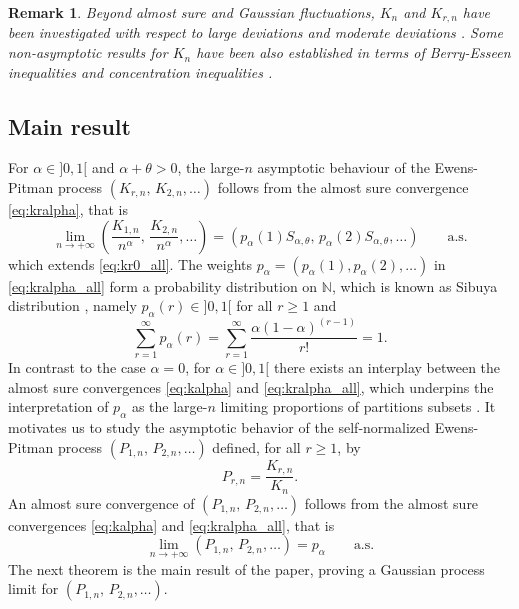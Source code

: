 \documentclass[twoside,12pt]{article}
\newtheorem{remark}[thm]{Remark}
\begin{document}
\begin{remark}
Beyond almost sure and Gaussian fluctuations, $K_{n}$ and $K_{r,n}$ have been investigated with respect to large deviations and moderate deviations \citep{Fen(98),Fav(14),Fav(18),BF25}. Some non-asymptotic results for $K_{n}$ have been also established in terms of Berry-Esseen inequalities \citep{Dol(20),Dol(21)} and concentration inequalities \citep{Per(22),BF25}.
\end{remark}

\subsection{Main result}

For $\alpha\in]0,1[$ and $\alpha+ \theta>0$, the large-$n$ asymptotic behaviour of the Ewens-Pitman process $(K_{r,n},\,K_{2,n},\ldots)$ follows from the almost sure convergence \eqref{eq:kralpha}, that is
\begin{equation}\label{eq:kralpha_all}
\lim_{n\rightarrow+\infty}\left(\frac{K_{1,n}}{n^{\alpha}},\,\frac{K_{2,n}}{n^{\alpha}},\ldots\right)=(p_{\alpha}(1)S_{\alpha,\theta},\,p_{\alpha}(2)S_{\alpha,\theta},\ldots)\qquad\text{a.s.}
\end{equation}
which extends \eqref{eq:kr0_all}. The weights $p_\alpha=(p_{\alpha}(1),p_{\alpha}(2),\ldots)$ in \eqref{eq:kralpha_all} form a probability distribution on $\mathbb{N}$, which is known as Sibuya distribution \citep{Dev(93)}, namely $p_{\alpha}(r)\in]0,1[$ for all $r\geq1$ and 
\begin{equation}\label{sum_sibuya}
\sum_{r=1}^\infty p_{\alpha}(r)=\sum_{r=1}^\infty \frac{\alpha(1-\alpha)^{(r-1)}}{r!} =1.
\end{equation}
In contrast to the case $\alpha=0$, for $\alpha\in]0,1[$ there exists an interplay between the almost sure convergences \eqref{eq:kalpha} and \eqref{eq:kralpha_all}, which underpins the interpretation of $p_{\alpha}$ as the large-$n$ limiting proportions of partitions subsets \citep[Lemma 1.1]{Pit(06)}. It motivates us to study the asymptotic behavior of the self-normalized Ewens-Pitman process $(P_{1,n},\,P_{2,n},\ldots)$ defined, for all $r\geq1$, by
\begin{equation}
\label{DEFPrn}
P_{r,n}=\frac{K_{r,n}}{K_{n}}.
\end{equation}
An almost sure convergence of $(P_{1,n},\,P_{2,n},\ldots)$ follows from the almost sure convergences \eqref{eq:kalpha} and \eqref{eq:kralpha_all}, that is 
\begin{equation}\label{eq:kralpha_self}
\lim_{n\rightarrow+\infty}(P_{1,n},\,P_{2,n},\ldots)=p_{\alpha}\qquad\text{a.s.}
\end{equation}
The next theorem is the main result of the paper, proving a Gaussian process limit for $(P_{1,n},\,P_{2,n},\ldots)$.
\end{document}
